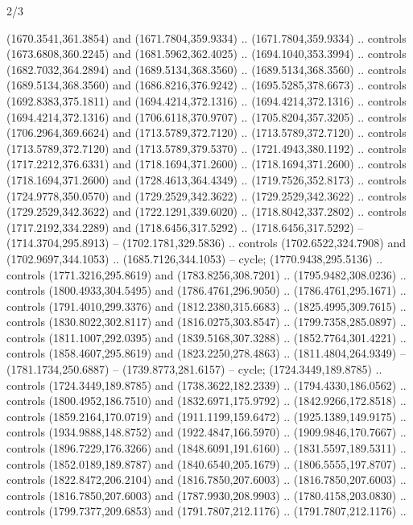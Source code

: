 \begin{flagdescription}{2/3}
\begin{scope}[shift=(c),scale=\flagwidth/391]
\begin{scope}[draw=black,fill=orange,line join=round,line cap=round,y=0.1mm, x=0.1mm,
 line width=0.001\flagwidth, yscale=-1,xscale=1,xshift=-172.5mm,yshift=-25mm]
  (1670.3541,361.3854) and (1671.7804,359.9334) .. (1671.7804,359.9334) ..
  controls (1673.6808,360.2245) and (1681.5962,362.4025) .. (1694.1040,353.3994)
  .. controls (1682.7032,364.2894) and (1689.5134,368.3560) ..
  (1689.5134,368.3560) .. controls (1689.5134,368.3560) and (1686.8216,376.9242)
  .. (1695.5285,378.6673) .. controls (1692.8383,375.1811) and
  (1694.4214,372.1316) .. (1694.4214,372.1316) .. controls (1694.4214,372.1316)
  and (1706.6118,370.9707) .. (1705.8204,357.3205) .. controls
  (1706.2964,369.6624) and (1713.5789,372.7120) .. (1713.5789,372.7120) ..
  controls (1713.5789,372.7120) and (1713.5789,379.5370) .. (1721.4943,380.1192)
  .. controls (1717.2212,376.6331) and (1718.1694,371.2600) ..
  (1718.1694,371.2600) .. controls (1718.1694,371.2600) and (1728.4613,364.4349)
  .. (1719.7526,352.8173) .. controls (1724.9778,350.0570) and
  (1729.2529,342.3622) .. (1729.2529,342.3622) .. controls (1729.2529,342.3622)
  and (1722.1291,339.6020) .. (1718.8042,337.2802) .. controls
  (1717.2192,334.2289) and (1718.6456,317.5292) .. (1718.6456,317.5292) --
  (1714.3704,295.8913) -- (1702.1781,329.5836) .. controls (1702.6522,324.7908)
  and (1702.9697,344.1053) .. (1685.7126,344.1053) -- cycle;
 (1770.9438,295.5136) .. controls (1771.3216,295.8619) and
  (1783.8256,308.7201) .. (1795.9482,308.0236) .. controls (1800.4933,304.5495)
  and (1786.4761,296.9050) .. (1786.4761,295.1671) .. controls
  (1791.4010,299.3376) and (1812.2380,315.6683) .. (1825.4995,309.7615) ..
  controls (1830.8022,302.8117) and (1816.0275,303.8547) .. (1799.7358,285.0897)
  .. controls (1811.1007,292.0395) and (1839.5168,307.3288) ..
  (1852.7764,301.4221) .. controls (1858.4607,295.8619) and (1823.2250,278.4863)
  .. (1811.4804,264.9349) -- (1781.1734,250.6887) -- (1739.8773,281.6157) --
  cycle;
 (1724.3449,189.8785) .. controls (1724.3449,189.8785) and
  (1738.3622,182.2339) .. (1794.4330,186.0562) .. controls (1800.4952,186.7510)
  and (1832.6971,175.9792) .. (1842.9266,172.8518) .. controls
  (1859.2164,170.0719) and (1911.1199,159.6472) .. (1925.1389,149.9175) ..
  controls (1934.9888,148.8752) and (1922.4847,166.5970) .. (1909.9846,170.7667)
  .. controls (1896.7229,176.3266) and (1848.6091,191.6160) ..
  (1831.5597,189.5311) .. controls (1852.0189,189.8787) and (1840.6540,205.1679)
  .. (1806.5555,197.8707) .. controls (1822.8472,206.2104) and
  (1816.7850,207.6003) .. (1816.7850,207.6003) .. controls (1816.7850,207.6003)
  and (1787.9930,208.9903) .. (1780.4158,203.0830) .. controls
  (1799.7377,209.6853) and (1791.7807,212.1176) .. (1791.7807,212.1176) ..

\end{scope}
\end{scope}
\end{flagdescription}
